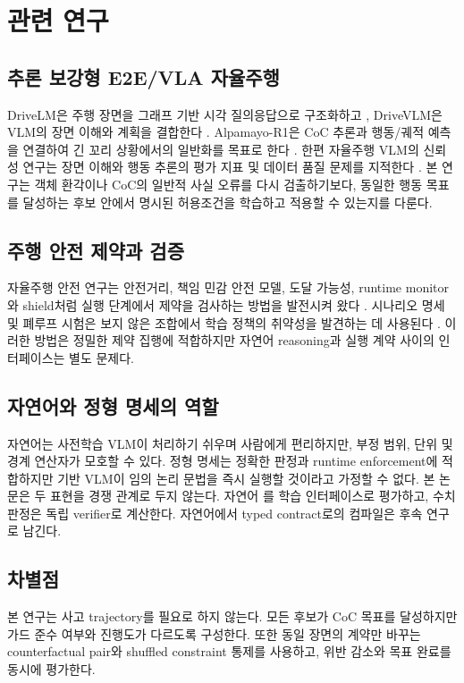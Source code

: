 \section{관련 연구}
\label{sec:related}

\subsection{추론 보강형 E2E/VLA 자율주행}

DriveLM은 주행 장면을 그래프 기반 시각 질의응답으로 구조화하고 \cite{sima2024drivelm}, DriveVLM은 VLM의 장면 이해와 계획을 결합한다 \cite{tian2024drivevlm}. Alpamayo-R1은 CoC 추론과 행동/궤적 예측을 연결하여 긴 꼬리 상황에서의 일반화를 목표로 한다 \cite{wang2025alpamayo}. 한편 자율주행 VLM의 신뢰성 연구는 장면 이해와 행동 추론의 평가 지표 및 데이터 품질 문제를 지적한다 \cite{xie2025drivebench}. 본 연구는 객체 환각이나 CoC의 일반적 사실 오류를 다시 검출하기보다, 동일한 행동 목표를 달성하는 후보 안에서 명시된 허용조건을 학습하고 적용할 수 있는지를 다룬다.

\subsection{주행 안전 제약과 검증}

자율주행 안전 연구는 안전거리, 책임 민감 안전 모델, 도달 가능성, runtime monitor와 shield처럼 실행 단계에서 제약을 검사하는 방법을 발전시켜 왔다 \cite{shalev2017rss,katz2019marabou}. 시나리오 명세 및 폐루프 시험은 보지 않은 조합에서 학습 정책의 취약성을 발견하는 데 사용된다 \cite{fremont2019scenic,zhang2023cat}. 이러한 방법은 정밀한 제약 집행에 적합하지만 자연어 reasoning과 실행 계약 사이의 인터페이스는 별도 문제다.

\subsection{자연어와 정형 명세의 역할}

자연어는 사전학습 VLM이 처리하기 쉬우며 사람에게 편리하지만, 부정 범위, 단위 및 경계 연산자가 모호할 수 있다. 정형 명세는 정확한 판정과 runtime enforcement에 적합하지만 기반 VLM이 임의 논리 문법을 즉시 실행할 것이라고 가정할 수 없다. 본 논문은 두 표현을 경쟁 관계로 두지 않는다. 자연어 \sccoc{}를 학습 인터페이스로 평가하고, 수치 판정은 독립 verifier로 계산한다. 자연어에서 typed contract로의 컴파일은 후속 연구로 남긴다.

\subsection{차별점}

본 연구는 사고 trajectory를 필요로 하지 않는다. 모든 후보가 CoC 목표를 달성하지만 가드 준수 여부와 진행도가 다르도록 구성한다. 또한 동일 장면의 계약만 바꾸는 counterfactual pair와 shuffled constraint 통제를 사용하고, 위반 감소와 목표 완료를 동시에 평가한다.
